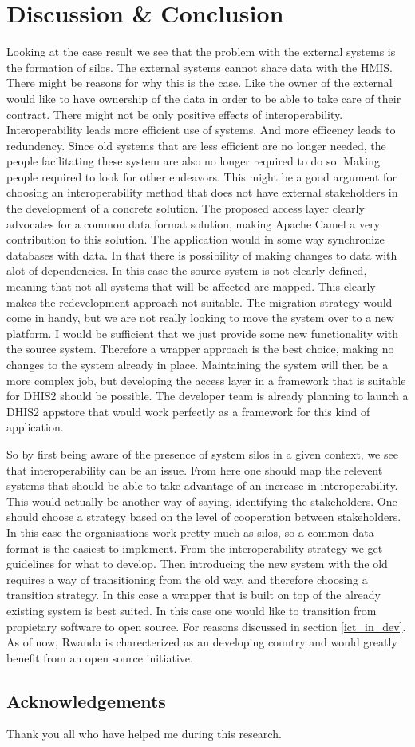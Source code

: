 
\chapter{Discussion \& Conclusion}
Looking at the case result we see that the problem with the external systems is the formation of silos.
The external systems cannot share data with the HMIS. There might be reasons for why this is the case.
Like the owner of the external would like to have ownership of the data in order to be able to take care of their contract.
There might not be only positive effects of interoperability. Interoperability leads more efficient use of systems. 
And more efficency leads to redundency. Since old systems that are less efficient are no longer needed, the people facilitating these system are also no longer required to do so. Making people required to look for other endeavors. 
This might be a good argument for choosing an interoperability method that does not have external stakeholders in the development of a concrete solution.
The proposed access layer clearly advocates for a common data format solution, making Apache Camel a very contribution to this solution. The application would in some way synchronize databases with data. In that there is possibility of making changes to data with alot of dependencies. In this case the source system is not clearly defined, meaning that not all systems that will be affected are mapped. 
This clearly makes the redevelopment approach not suitable. The migration strategy would come in handy, but we are not really looking to move the system over to a new platform. I would be sufficient that we just provide some new functionality with the source system. Therefore a wrapper approach is the best choice, making no changes to the system already in place. Maintaining the system will then be a more complex job, but developing the access layer in a framework that is suitable for DHIS2 should be possible. The developer team is already planning to launch a DHIS2 appstore that would work perfectly as a framework for this kind of application. 

So by first being aware of the presence of system silos in a given context, we see that interoperability can be an issue. From here one should map the relevent systems that should be able to take advantage of an increase in interoperability. This would actually be another way of saying, identifying the stakeholders. One should choose a strategy based on the level of cooperation between stakeholders. In this case the organisations work pretty much as silos, so a common data format is the easiest to implement. From the interoperability strategy we get guidelines for what to develop. Then introducing the new system with the old requires a way of transitioning from the old way, and therefore choosing a transition strategy. In this case a wrapper that is built on top of the already existing system is best suited. In this case one would like to transition from propietary software to open source. For reasons discussed in section \ref{ict_in_dev}. As of now, Rwanda is charecterized as an developing country and would greatly benefit from an open source initiative.

\section{Acknowledgements}
Thank you all who have helped me during this research.


